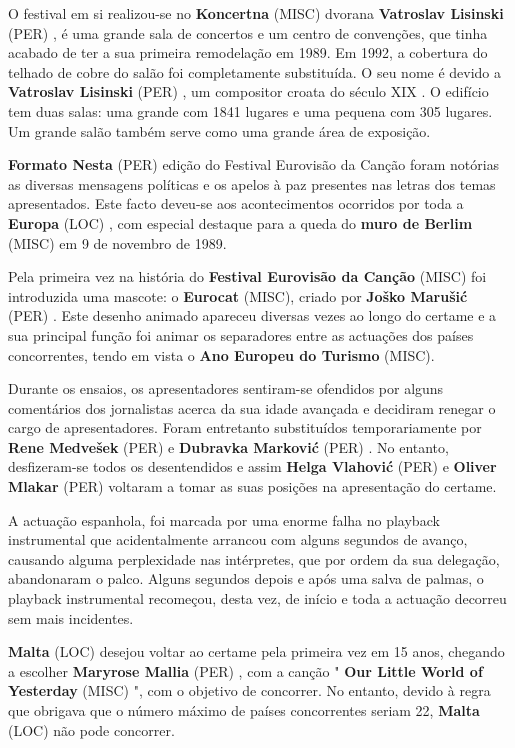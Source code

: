 \documentclass[12pt,a4paper]{article}
\begin{document}
O festival em si realizou-se no \textbf{Koncertna} (MISC) dvorana \textbf{Vatroslav Lisinski} (PER) , é uma grande sala de concertos e um centro de convenções, que tinha acabado de ter a sua primeira remodelação em 1989. Em 1992, a cobertura do telhado de cobre do salão foi completamente substituída. O seu nome é devido a \textbf{Vatroslav Lisinski} (PER) , um compositor croata do século XIX . O edifício tem duas salas: uma grande com 1841 lugares e uma pequena com 305 lugares. Um grande salão também serve como uma grande área de exposição.



\textbf{Formato Nesta} (PER) edição do Festival Eurovisão da Canção foram notórias as diversas mensagens políticas e os apelos à paz presentes nas letras dos temas apresentados. Este facto deveu-se aos acontecimentos ocorridos por toda a \textbf{Europa} (LOC) , com especial destaque para a queda do \textbf{muro de Berlim} (MISC) em 9 de novembro de 1989.

Pela primeira vez na história do \textbf{Festival Eurovisão da Canção} (MISC) foi introduzida uma mascote: o \textbf{Eurocat} (MISC), criado por \textbf{Joško Marušić} (PER) . Este desenho animado apareceu diversas vezes ao longo do certame e a sua principal função foi animar os separadores entre as actuações dos países concorrentes, tendo em vista o \textbf{Ano Europeu do Turismo} (MISC).

Durante os ensaios, os apresentadores sentiram-se ofendidos por alguns comentários dos jornalistas acerca da sua idade avançada e decidiram renegar o cargo de apresentadores. Foram entretanto substituídos temporariamente por \textbf{Rene Medvešek} (PER) e \textbf{Dubravka Marković} (PER) . No entanto, desfizeram-se todos os desentendidos e assim \textbf{Helga Vlahović} (PER) e \textbf{Oliver Mlakar} (PER) voltaram a tomar as suas posições na apresentação do certame.

A actuação espanhola, foi marcada por uma enorme falha no playback instrumental que acidentalmente arrancou com alguns segundos de avanço, causando alguma perplexidade nas intérpretes, que por ordem da sua delegação, abandonaram o palco. Alguns segundos depois e após uma salva de palmas, o playback instrumental recomeçou, desta vez, de início e toda a actuação decorreu sem mais incidentes.

\textbf{Malta} (LOC) desejou voltar ao certame pela primeira vez em 15 anos, chegando a escolher \textbf{Maryrose Mallia} (PER) , com a canção " \textbf{Our Little World of Yesterday} (MISC) ", com o objetivo de concorrer. No entanto, devido à regra que obrigava que o número máximo de países concorrentes seriam 22, \textbf{Malta} (LOC) não pode concorrer.
\end{document}
